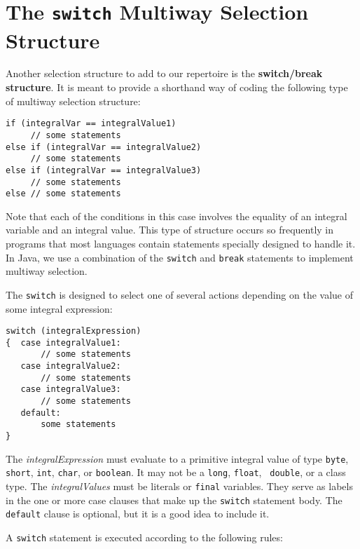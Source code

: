\section{The {\tt switch} Multiway Selection Structure}

\noindent Another selection structure to add to our repertoire is the {\bf
switch/break structure}.  It is meant
to provide a
shorthand way of coding the following type of multiway selection
structure:

\begin{jjjlisting}
\begin{lstlisting}
if (integralVar == integralValue1)
     // some statements
else if (integralVar == integralValue2)
     // some statements
else if (integralVar == integralValue3)
     // some statements
else // some statements
\end{lstlisting}
\end{jjjlisting}

\noindent Note that each of the conditions in this case involves the
equality of an integral variable and an integral value.  This type of
structure occurs so frequently in programs that most languages contain
statements specially designed to handle it.  In Java, we use a
combination of the {\tt switch} and {\tt break} statements to
implement multiway selection.

The {\tt switch} is designed to select one of several actions
depending on the value of some integral expression:

\begin{jjjlisting}
\begin{lstlisting}
switch (integralExpression)
{  case integralValue1:
       // some statements
   case integralValue2:
       // some statements
   case integralValue3:
       // some statements
   default:
       some statements
}
\end{lstlisting}
\end{jjjlisting}

\noindent The {\it integralExpression} must evaluate to a primitive integral
value of type {\tt byte}, {\tt short}, {\tt int}, {\tt char},
or {\tt boolean}. It may not be a {\tt long}, {\tt float}, {\tt
double}, or a class type.  The {\it integralValues} must be literals
or {\tt final} variables.  They serve as labels in the one or more
case clauses that make up the {\tt switch} statement body.  The {\tt
default} clause is optional, but it is a good idea to include it.

A {\tt switch} statement is executed according
to the following rules:

